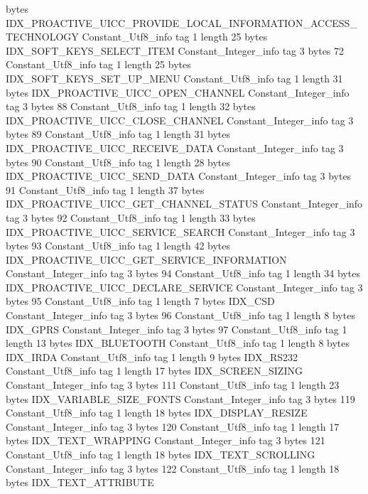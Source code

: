 {{{			bytes	IDX_PROACTIVE_UICC_PROVIDE_LOCAL_INFORMATION_ACCESS_TECHNOLOGY
		}
		Constant_Utf8_info {
			tag	1
			length	25
			bytes	IDX_SOFT_KEYS_SELECT_ITEM
		}
		Constant_Integer_info {
			tag	3
			bytes	72
		}
		Constant_Utf8_info {
			tag	1
			length	25
			bytes	IDX_SOFT_KEYS_SET_UP_MENU
		}
		Constant_Utf8_info {
			tag	1
			length	31
			bytes	IDX_PROACTIVE_UICC_OPEN_CHANNEL
		}
		Constant_Integer_info {
			tag	3
			bytes	88
		}
		Constant_Utf8_info {
			tag	1
			length	32
			bytes	IDX_PROACTIVE_UICC_CLOSE_CHANNEL
		}
		Constant_Integer_info {
			tag	3
			bytes	89
		}
		Constant_Utf8_info {
			tag	1
			length	31
			bytes	IDX_PROACTIVE_UICC_RECEIVE_DATA
		}
		Constant_Integer_info {
			tag	3
			bytes	90
		}
		Constant_Utf8_info {
			tag	1
			length	28
			bytes	IDX_PROACTIVE_UICC_SEND_DATA
		}
		Constant_Integer_info {
			tag	3
			bytes	91
		}
		Constant_Utf8_info {
			tag	1
			length	37
			bytes	IDX_PROACTIVE_UICC_GET_CHANNEL_STATUS
		}
		Constant_Integer_info {
			tag	3
			bytes	92
		}
		Constant_Utf8_info {
			tag	1
			length	33
			bytes	IDX_PROACTIVE_UICC_SERVICE_SEARCH
		}
		Constant_Integer_info {
			tag	3
			bytes	93
		}
		Constant_Utf8_info {
			tag	1
			length	42
			bytes	IDX_PROACTIVE_UICC_GET_SERVICE_INFORMATION
		}
		Constant_Integer_info {
			tag	3
			bytes	94
		}
		Constant_Utf8_info {
			tag	1
			length	34
			bytes	IDX_PROACTIVE_UICC_DECLARE_SERVICE
		}
		Constant_Integer_info {
			tag	3
			bytes	95
		}
		Constant_Utf8_info {
			tag	1
			length	7
			bytes	IDX_CSD
		}
		Constant_Integer_info {
			tag	3
			bytes	96
		}
		Constant_Utf8_info {
			tag	1
			length	8
			bytes	IDX_GPRS
		}
		Constant_Integer_info {
			tag	3
			bytes	97
		}
		Constant_Utf8_info {
			tag	1
			length	13
			bytes	IDX_BLUETOOTH
		}
		Constant_Utf8_info {
			tag	1
			length	8
			bytes	IDX_IRDA
		}
		Constant_Utf8_info {
			tag	1
			length	9
			bytes	IDX_RS232
		}
		Constant_Utf8_info {
			tag	1
			length	17
			bytes	IDX_SCREEN_SIZING
		}
		Constant_Integer_info {
			tag	3
			bytes	111
		}
		Constant_Utf8_info {
			tag	1
			length	23
			bytes	IDX_VARIABLE_SIZE_FONTS
		}
		Constant_Integer_info {
			tag	3
			bytes	119
		}
		Constant_Utf8_info {
			tag	1
			length	18
			bytes	IDX_DISPLAY_RESIZE
		}
		Constant_Integer_info {
			tag	3
			bytes	120
		}
		Constant_Utf8_info {
			tag	1
			length	17
			bytes	IDX_TEXT_WRAPPING
		}
		Constant_Integer_info {
			tag	3
			bytes	121
		}
		Constant_Utf8_info {
			tag	1
			length	18
			bytes	IDX_TEXT_SCROLLING
		}
		Constant_Integer_info {
			tag	3
			bytes	122
		}
		Constant_Utf8_info {
			tag	1
			length	18
			bytes	IDX_TEXT_ATTRIBUTE
}}}
